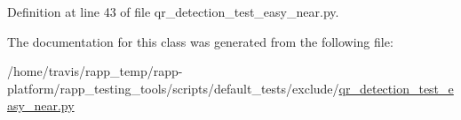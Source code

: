 Definition at line 43 of file qr\-\_\-detection\-\_\-test\-\_\-easy\-\_\-near.\-py.



The documentation for this class was generated from the following file\-:\begin{DoxyCompactItemize}
\item 
/home/travis/rapp\-\_\-temp/rapp-\/platform/rapp\-\_\-testing\-\_\-tools/scripts/default\-\_\-tests/exclude/\hyperlink{qr__detection__test__easy__near_8py}{qr\-\_\-detection\-\_\-test\-\_\-easy\-\_\-near.\-py}\end{DoxyCompactItemize}
